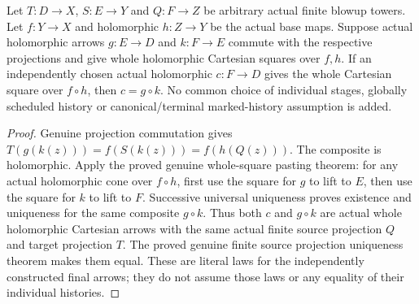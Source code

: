 \begin{theorem}
\label{hir:actual-elementary-cartesian-composition}
Let $T:D\to X$, $S:E\to Y$ and $Q:F\to Z$ be arbitrary actual
finite blowup towers. Let $f:Y\to X$ and holomorphic $h:Z\to Y$
be the actual base maps. Suppose actual holomorphic arrows $g:E\to D$
and $k:F\to E$ commute with the respective projections and give
whole holomorphic Cartesian squares over $f,h$. If an independently
chosen actual holomorphic $c:F\to D$ gives the whole Cartesian square
over $f\circ h$, then $c=g\circ k$.
No common choice of individual stages, globally scheduled history or
canonical/terminal marked-history assumption is added.
\leanok
\end{theorem}
\begin{proof}
Genuine projection commutation gives
$T(g(k(z)))=f(S(k(z)))=f(h(Q(z)))$. The composite is holomorphic.
Apply the proved genuine whole-square pasting theorem: for any actual
holomorphic cone over $f\circ h$, first use the square for $g$ to
lift to $E$, then use the square for $k$ to lift to $F$. Successive
universal uniqueness proves existence and uniqueness for the same
composite $g\circ k$. Thus both $c$ and $g\circ k$ are actual whole
holomorphic Cartesian arrows with the same actual finite source
projection $Q$ and target projection $T$. The proved genuine finite
source projection uniqueness theorem makes them equal. These are
literal laws for the independently constructed final arrows; they do
not assume those laws or any equality of their individual histories.
\end{proof}
